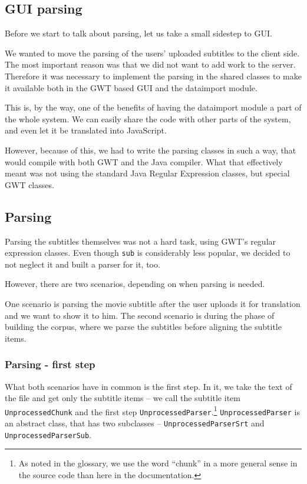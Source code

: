 \subsection*{GUI parsing}
Before we start to talk about parsing, let us take a small sidestep to GUI.

We wanted to move the parsing of the users' uploaded subtitles to the client side. The most important reason was that we did not want to add work to the server. Therefore it was necessary to implement the parsing in the shared classes to make it available both in the GWT based GUI and the dataimport module.

This is, by the way, one of the benefits of having the dataimport module a part of the whole system. We can easily share the code with other parts of the system, and even let it be translated into JavaScript.

However, because of this, we had to write the parsing classes in such a way, that would compile with both GWT and the Java compiler. What that effectively meant was not using the standard Java Regular Expression classes, but special GWT classes.

\subsection*{Parsing}
Parsing the subtitles themselves was not a hard task, using GWT's regular expression classes. Even though \texttt{sub} is considerably less popular, we decided to not neglect it and built a parser for it, too.

However, there are two scenarios, depending on when parsing is needed.

One scenario is parsing the movie subtitle after the user uploads it for translation and we want to show it to him. The second scenario is during the phase of building the corpus, where we parse the subtitles before aligning the subtitle items.

\subsubsection*{Parsing - first step}

What both scenarios have in common is the first step. In it, we take the text of the file and get only the subtitle items -- we call the subtitle item \texttt{UnprocessedChunk} and the first step \texttt{UnprocessedParser}.\footnote{As noted in the glossary, we use the word ``chunk'' in a more general sense in the source code than here in the documentation.} \texttt{UnprocessedParser} is an abstract class, that has two subclasses -- \texttt{UnprocessedParserSrt} and \texttt{UnprocessedParserSub}.

